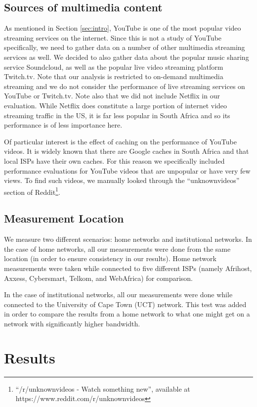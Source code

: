 \documentclass{sig-alternate-05-2015}
\begin{document}
\subsection{Sources of multimedia content}
As mentioned in Section \ref{sec:intro}, YouTube is one of the most popular video streaming services on the internet. Since this is not a study of YouTube specifically, we need to gather data on a number of other multimedia streaming services as well. We decided to also gather data about the popular music sharing service Soundcloud, as well as the popular live video streaming platform Twitch.tv. Note that our analysis is restricted to on-demand multimedia streaming and we do not consider the performance of live streaming services on YouTube or Twitch.tv. Note also that we did not include Netflix in our evaluation. While Netflix does constitute a large portion of internet video streaming traffic in the US, it is far less popular in South Africa and so its performance is of less importance here.

Of particular interest is the effect of caching on the performance of YouTube videos. It is widely known that there are Google caches in South Africa and that local ISPs have their own caches. For this reason we specifically included performance evaluations for YouTube videos that are unpopular or have very few views. To find such videos, we manually looked through the ``unknownvideos'' section of Reddit\footnote{``/r/unknownvideos - Watch something new'', available at https://www.reddit.com/r/unknownvideos}.

\subsection{Measurement Location}
We measure two different scenarios: home networks and institutional networks. In the case of home networks, all our measurements were done from the same location (in order to ensure consistency in our results). Home network measurements were taken while connected to five different ISPs (namely Afrihost, Axxess, Cybersmart, Telkom, and WebAfrica) for comparison.

In the case of institutional networks, all our measurements were done while connected to the University of Cape Town (UCT) network. This test was added in order to compare the results from a home network to what one might get on a network with significantly higher bandwidth.

\section{Results}\label{sec:results}
\end{document}
